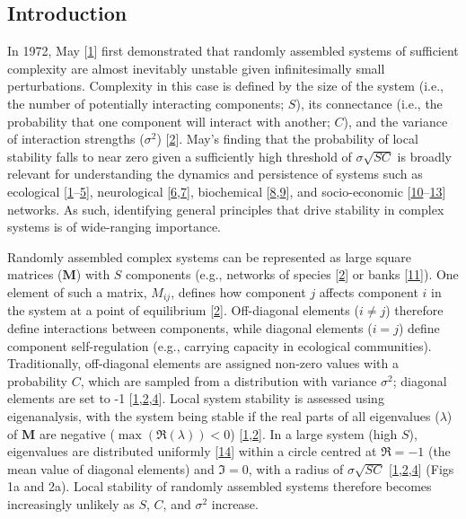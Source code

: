 \documentclass[]{article}
\begin{document}
\subsection{Introduction}\label{introduction}

In 1972, May {[}\protect\hyperlink{ref-May1972}{1}{]} first demonstrated
that randomly assembled systems of sufficient complexity are almost
inevitably unstable given infinitesimally small perturbations.
Complexity in this case is defined by the size of the system (i.e., the
number of potentially interacting components; \(S\)), its connectance
(i.e., the probability that one component will interact with another;
\(C\)), and the variance of interaction strengths (\(\sigma^{2}\))
{[}\protect\hyperlink{ref-Allesina2012}{2}{]}. May's finding that the
probability of local stability falls to near zero given a sufficiently
high threshold of \(\sigma\sqrt{SC}\) is broadly relevant for
understanding the dynamics and persistence of systems such as ecological
{[}\protect\hyperlink{ref-May1972}{1}--\protect\hyperlink{ref-Grilli2017}{5}{]},
neurological
{[}\protect\hyperlink{ref-Gray2008}{6},\protect\hyperlink{ref-Gray2009}{7}{]},
biochemical
{[}\protect\hyperlink{ref-Rosenfeld2009}{8},\protect\hyperlink{ref-MacArthur2010}{9}{]},
and socio-economic
{[}\protect\hyperlink{ref-May2008}{10}--\protect\hyperlink{ref-Bardoscia2017}{13}{]}
networks. As such, identifying general principles that drive stability
in complex systems is of wide-ranging importance.

Randomly assembled complex systems can be represented as large square
matrices (\(\mathbf{M}\)) with \(S\) components (e.g., networks of
species {[}\protect\hyperlink{ref-Allesina2012}{2}{]} or banks
{[}\protect\hyperlink{ref-Haldane2011}{11}{]}). One element of such a
matrix, \(M_{ij}\), defines how component \(j\) affects component \(i\)
in the system at a point of equilibrium
{[}\protect\hyperlink{ref-Allesina2012}{2}{]}. Off-diagonal elements
(\(i \neq j\)) therefore define interactions between components, while
diagonal elements (\(i = j\)) define component self-regulation (e.g.,
carrying capacity in ecological communities). Traditionally,
off-diagonal elements are assigned non-zero values with a probability
\(C\), which are sampled from a distribution with variance
\(\sigma^{2}\); diagonal elements are set to -1
{[}\protect\hyperlink{ref-May1972}{1},\protect\hyperlink{ref-Allesina2012}{2},\protect\hyperlink{ref-Allesina2015}{4}{]}.
Local system stability is assessed using eigenanalysis, with the system
being stable if the real parts of all eigenvalues (\(\lambda\)) of
\(\mathbf{M}\) are negative (\(\max\left(\Re(\lambda)\right) < 0\))
{[}\protect\hyperlink{ref-May1972}{1},\protect\hyperlink{ref-Allesina2012}{2}{]}.
In a large system (high \(S\)), eigenvalues are distributed uniformly
{[}\protect\hyperlink{ref-Tao2010}{14}{]} within a circle centred at
\(\Re = -1\) (the mean value of diagonal elements) and \(\Im = 0\), with
a radius of \(\sigma\sqrt{SC}\)
{[}\protect\hyperlink{ref-May1972}{1},\protect\hyperlink{ref-Allesina2012}{2},\protect\hyperlink{ref-Allesina2015}{4}{]}
(Figs 1a and 2a). Local stability of randomly assembled systems
therefore becomes increasingly unlikely as \(S\), \(C\), and
\(\sigma^{2}\) increase.
\end{document}
